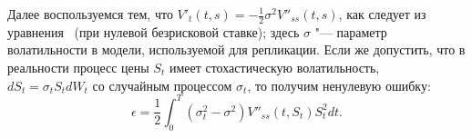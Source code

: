 Далее воспользуемся тем, что $V'_t(t,s) = -\frac12 \sigma^2 V''_{ss}(t,s)$, как следует из уравнения \bs\ (при нулевой безрисковой ставке); здесь $\sigma$ "--- параметр волатильности в модели, используемой для репликации.
Если же допустить, что в реальности процесс цены $S_t$ имеет стохастическую волатильность, \te\ $dS_t = \sigma_t S_t d W_t$ со случайным процессом $\sigma_t$, то получим ненулевую ошибку:
\[
\epsilon = \frac12 \int_0^T (\sigma_t^2 - \sigma^2) V''_{ss}(t,S_t)S_t^2 dt.
\]



